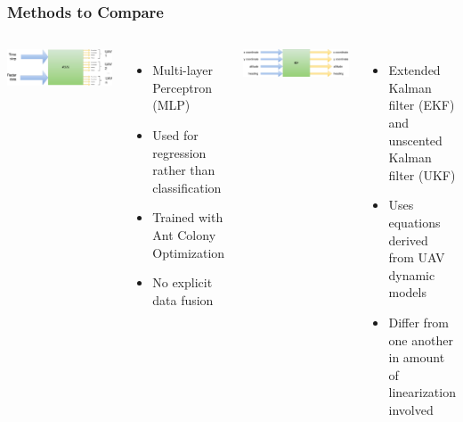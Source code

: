 \documentclass{beamer}
\begin{document}
\begin{frame}
\frametitle{Methods to Compare}
\begin{columns}
\includegraphics[width=\textwidth]{io}
\begin{itemize}
\item Multi-layer Perceptron (MLP)
\item Used for regression rather than classification
\item Trained with Ant Colony Optimization
\item No explicit data fusion
\end{itemize}

\includegraphics[width=\textwidth]{kf-fig}
\begin{itemize}
\item Extended Kalman filter (EKF) and unscented Kalman filter (UKF)
\item Uses equations derived from UAV dynamic models
\item Differ from one another in amount of linearization involved
\end{itemize}
\end{columns}
\end{frame}
\end{document}
